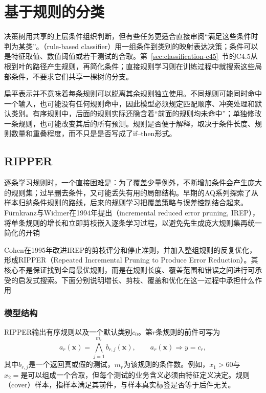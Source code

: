 \section{基于规则的分类}
\label{sec:classification-rules}

决策树用共享的上层条件组织判断，但有些任务更适合直接审阅“满足这些条件时判为某类”。（rule-based classifier）用一组条件到类别的映射表达决策；条件可以是特征取值、数值阈值或若干测试的合取。第~\ref{sec:classification-c45}~节的C4.5从根到叶的路径产生规则，再简化条件；直接规则学习则在训练过程中就搜索这些局部条件，不要求它们共享一棵树的分支。

扁平表示并不意味着每条规则可以脱离其余规则独立使用。不同规则可能同时命中一个输入，也可能没有任何规则命中，因此模型必须规定匹配顺序、冲突处理和默认类别。有序规则中，后面的规则实际还隐含着“前面的规则均未命中”；单独修改一条规则，也可能改变其后的所有预测。规则是否便于解释，取决于条件长度、规则数量和重叠程度，而不只是是否写成了if--then形式。

\subsection{RIPPER}
\label{sec:classification-ripper}

逐条学习规则时，一个直接困难是：为了覆盖少量例外，不断增加条件会产生庞大的规则集；过早删去条件，又可能丢失有用的局部结构。早期的AQ系列探索了从样本归纳条件规则的路线，后来的规则学习把覆盖策略与误差控制结合起来。Fürnkranz与Widmer在1994年提出（incremental reduced error pruning, IREP），将单条规则的增长和立即剪枝嵌入逐条学习过程，以避免先生成庞大规则集再统一简化的开销

Cohen在1995年改进IREP的剪枝评分和停止准则，并加入整组规则的反复优化，形成RIPPER（Repeated Incremental Pruning to Produce Error Reduction）。其核心不是保证找到全局最优规则，而是在规则长度、覆盖范围和错误之间进行可承受的启发式搜索。下面分别说明增长、剪枝、覆盖和优化在这一过程中承担什么作用

\subsubsection{模型结构}
\label{sec:classification-ripper-structure}

RIPPER输出有序规则以及一个默认类别$c_0$。第$r$条规则的前件可写为
\begin{equation}
  a_r(\bm{x})=\bigwedge_{j=1}^{m_r}b_{r,j}(\bm{x}),
  \qquad a_r(\bm{x})\Longrightarrow y=c_r,
  \label{eq:classification-rule-form}
\end{equation}
其中$b_{r,j}$是一个返回真或假的测试，$m_r$为该规则的条件数。例如，$x_1>60$与$x_2=\text{是}$可以组成一个合取，但每个测试的业务含义必须由特征定义决定。规则（cover）样本，指样本满足其前件，与样本真实标签是否等于后件无关。

